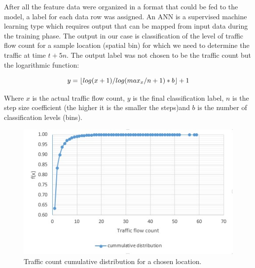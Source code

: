 \documentclass[12pt, a4paper]{report}
\theoremstyle{definition}
\theoremstyle{definition}%
\theoremstyle{definition}%
\theoremstyle{definition}%
\theoremstyle{definition}%
\theoremstyle{definition}%
\begin{document}
After all the feature data were organized in a format that could be fed to the model, a label for each data row was assigned. An ANN is a supervised machine learning type which requires output that can be mapped from input data during the training phase. The output in our case is classification of the level of traffic flow count for a sample location (spatial bin) for which we need to determine the traffic at time $t + 5n$. The output label was not chosen to be the traffic count but the logarithmic function: 

\begin{equation} \label{equation:logarithmic_step_function}
y=\lfloor{log(x+1)/log(max_x/n + 1) * b}\rfloor + 1  \\
\end{equation}

Where $x$ is the actual traffic flow count, $y$ is the final classification label, $n$ is the step size coefficient (the higher it is the smaller the steps)and $b$ is the number of classification levels (bins). 

\begin{figure}[h]	
	\includegraphics[scale=0.9]{traffic_count_cumm_distribution.jpg}
	\centering
	\caption{Traffic count cumulative distribution for a chosen location. }
	\label{fig:traffic_count_distribution_distribution}
\end{figure}
\end{document}
